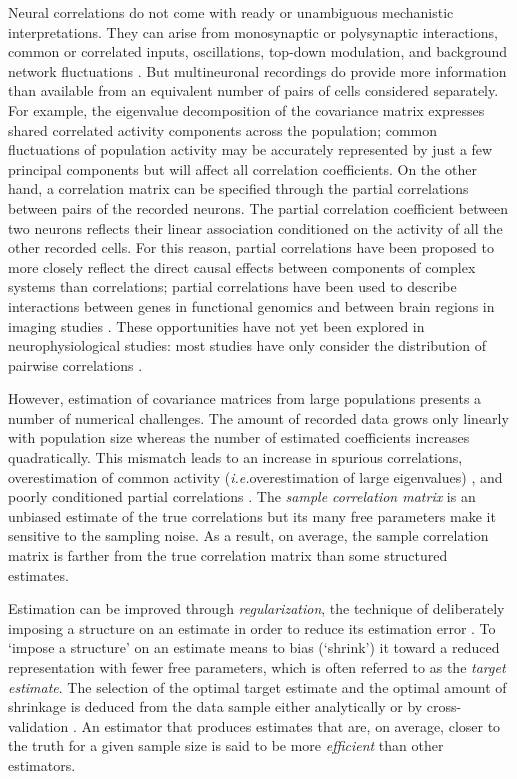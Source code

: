 \documentclass[10pt]{article}
\newcommand{\sq}[1]{\lq#1\rq}
\newcommand{\ie}{\emph{i.e.}\;}
\begin{document}
Neural correlations do not come with ready or unambiguous mechanistic interpretations. They can arise from monosynaptic or polysynaptic interactions, common or correlated inputs, oscillations, top-down modulation, and background network fluctuations \cite{Perkel:1967, Moore:1970, Shadlen:1998, Salinas:2001, Ostojic:2009, Rosenbaum:2011}. But multineuronal recordings do provide more information than available from an equivalent number of pairs of cells considered separately. For example, the eigenvalue decomposition of the covariance matrix expresses shared correlated activity components across the population; common fluctuations of population activity may be accurately represented by just a few principal components but will affect all correlation coefficients. On the other hand, a correlation matrix can be specified through the  partial correlations between pairs of the recorded neurons. The partial correlation coefficient between two neurons reflects their linear association conditioned on the activity of all the other recorded cells.  For this reason, partial correlations have been proposed to more closely reflect the direct causal effects between components of complex systems than correlations; partial correlations have been used to describe interactions between genes in functional genomics \cite{Schafer:2005, Peng:2009} and between brain regions in imaging studies \cite{Varoquaux:2012, Ryali:2012}. These opportunities have not yet been explored in neurophysiological studies: most studies have only consider the distribution of pairwise correlations \cite{Zohary:1994, Bair:2001, Smith:2008, Ecker:2010}. 

However, estimation of covariance matrices from large populations presents a number of numerical challenges. The amount of recorded data grows only linearly with population size whereas the number of estimated coefficients increases quadratically. This mismatch leads to an increase in spurious correlations, overestimation of common activity (\ie overestimation of large eigenvalues) \cite{Ledoit:2004}, and poorly conditioned partial correlations \cite{Schafer:2005}. The \emph{sample correlation matrix} is an unbiased estimate of the true correlations but its many free parameters make it sensitive to the sampling noise. As a result, on average, the sample correlation matrix is farther from the true correlation matrix than some structured estimates. 

Estimation can be improved through \emph{regularization},  the technique of deliberately imposing a structure on an estimate in order to reduce its estimation error \cite{Schafer:2005, Bickel:2006}. To \sq{impose a structure} on an estimate means to bias (\sq{shrink}) it toward a reduced representation with fewer free parameters, which is often referred to as the \emph{target estimate}.   The selection of the optimal target estimate and the optimal amount of shrinkage is deduced from the data sample either analytically \cite{Ledoit:2003, Ledoit:2004, Schafer:2005}  or by cross-validation \cite{Friedman:1989}. An estimator that produces estimates that are, on average, closer to the truth for a given sample size is said to be more \emph{efficient} than other estimators.
\end{document}
